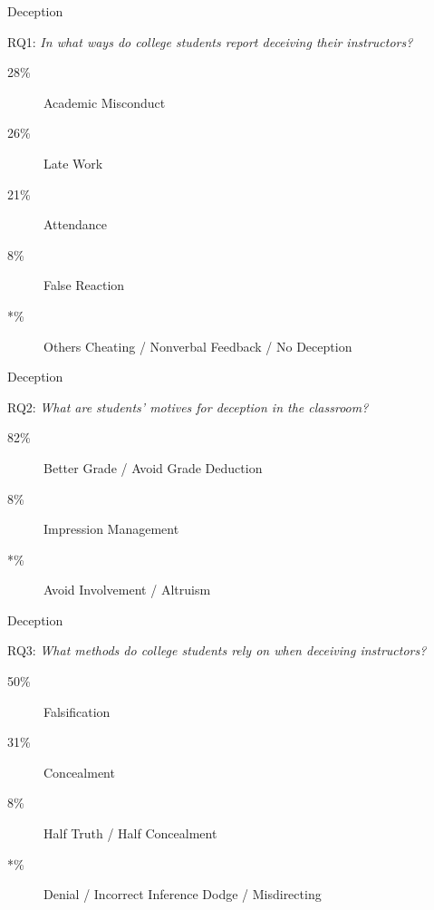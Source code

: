 		\begin{frame}{Deception}
				
			RQ1: \emph{In what ways do college students report deceiving their instructors?}

			\begin{description}
				\item[28\%]
					Academic Misconduct
				\item[26\%]
					Late Work
				\item[21\%] 
					Attendance
				\item[8\%]
					False Reaction
				\item[*\%]
					Others Cheating / Nonverbal Feedback / No Deception
			\end{description}

		\end{frame}

		\begin{frame}{Deception}
				
			RQ2: \emph{What are students’ motives for deception in the classroom?}

			\begin{description}
				\item[82\%]
					Better Grade / Avoid Grade Deduction
				\item[8\%]
					Impression Management
				\item[*\%] 
					Avoid Involvement / Altruism
			\end{description}

		\end{frame}

		\begin{frame}{Deception}
				
			RQ3: \emph{What methods do college students rely on when deceiving instructors?}

			\begin{description}
				\item[50\%]
					Falsification
				\item[31\%]
					Concealment
				\item[8\%] 
					Half Truth / Half Concealment
				\item[*\%]
					Denial / Incorrect Inference Dodge / Misdirecting
			\end{description}

		\end{frame}

